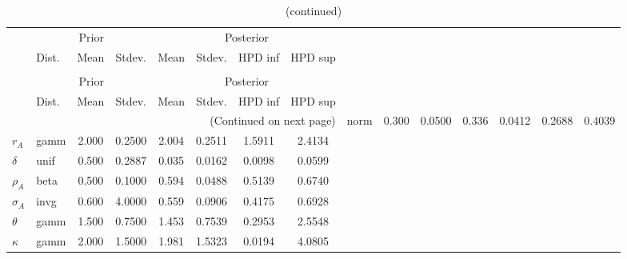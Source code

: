  
\begin{center}
\begin{longtable}{llcccccc} 
\caption{Results from Metropolis-Hastings (parameters)}
 \label{Table:MHPosterior:1}\\
\toprule 
  & \multicolumn{3}{c}{Prior}  &  \multicolumn{4}{c}{Posterior} \\
  \cmidrule(r{.75em}){2-4} \cmidrule(r{.75em}){5-8}
  & Dist. & Mean  & Stdev. & Mean & Stdev. & HPD inf & HPD sup\\
\midrule \endfirsthead 
\caption{(continued)}\\\toprule 
  & \multicolumn{3}{c}{Prior}  &  \multicolumn{4}{c}{Posterior} \\
  \cmidrule(r{.75em}){2-4} \cmidrule(r{.75em}){5-8}
  & Dist. & Mean  & Stdev. & Mean & Stdev. & HPD inf & HPD sup\\
\midrule \endhead 
\bottomrule \multicolumn{8}{r}{(Continued on next page)} \endfoot 
\bottomrule \endlastfoot 
${\alpha}$ & norm &   0.300 & 0.0500 &   0.336& 0.0412 &  0.2688 &  0.4039 \\ 
${r_{A}}$ & gamm &   2.000 & 0.2500 &   2.004& 0.2511 &  1.5911 &  2.4134 \\ 
${\delta}$ & unif &   0.500 & 0.2887 &   0.035& 0.0162 &  0.0098 &  0.0599 \\ 
${\rho_A}$ & beta &   0.500 & 0.1000 &   0.594& 0.0488 &  0.5139 &  0.6740 \\ 
${\sigma_A}$ & invg &   0.600 & 4.0000 &   0.559& 0.0906 &  0.4175 &  0.6928 \\ 
${\theta}$ & gamm &   1.500 & 0.7500 &   1.453& 0.7539 &  0.2953 &  2.5548 \\ 
${\kappa}$ & gamm &   2.000 & 1.5000 &   1.981& 1.5323 &  0.0194 &  4.0805 \\ 
\end{longtable}
 \end{center}
